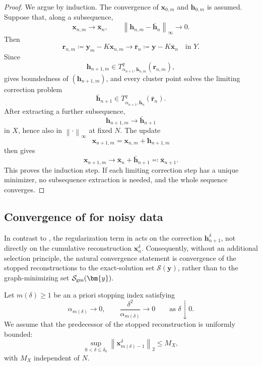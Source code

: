 \documentclass{article}
\theoremstyle{remark}
\newcommand{\norm}[1]{\left\lVert #1 \right\rVert}
\newcommand{\Ssol}{\mathcal{S}}
\newcommand{\bx}{{\bm{x}}}
\newcommand{\by}{{\bm{y}}}
\newcommand{\bh}{{\bm{h}}}
\newcommand{\br}{{\bm{r}}}
\begin{document}
\begin{proof}
We argue by induction. The convergence of \(\bx_{0,m}\) and \(\bh_{0,m}\) is
assumed. Suppose that, along a subsequence,
\[
\bx_{n,m}\to \bar\bx_n,
\qquad
\norm{\bh_{n,m}-\bar\bh_n}_\infty\to0 .
\]
Then
\[
\br_{n,m}\coloneqq \by_m-K\bx_{n,m}
\to
\bar\br_n\coloneqq \by-K\bar\bx_n
\quad\text{in }Y .
\]
Since
\[
\bh_{n+1,m}\in T_{\alpha_{n+1},\bh_{n,m}}^q(\br_{n,m}),
\]
 gives boundedness of
\((\bh_{n+1,m})\), and every cluster point solves the limiting correction
problem
\[
\bar\bh_{n+1}\in T_{\alpha_{n+1},\bar\bh_n}^q(\bar\br_n).
\]
After extracting a further subsequence,
\[
\bh_{n+1,m}\to \bar\bh_{n+1}
\]
in \(X\), hence also in \(\norm{\cdot}_\infty\) at fixed \(N\). The update
\[
\bx_{n+1,m}=\bx_{n,m}+\bh_{n+1,m}
\]
then gives
\[
\bx_{n+1,m}\to \bar\bx_n+\bar\bh_{n+1}\eqqcolon \bar\bx_{n+1}.
\]
This proves the induction step. If each limiting correction step has a unique
minimizer, no subsequence extraction is needed, and the whole sequence converges.
\end{proof}

\subsection{Convergence of \texorpdfstring{}{the error-equation scheme} for noisy data}
\label{sec:error-noisy}

In contrast to , the regularization term in
 acts on the correction \(\bh_{n+1}^\delta\), not directly
on the cumulative reconstruction \(\bx_n^\delta\). Consequently, without an
additional selection principle, the natural convergence statement is convergence
of the stopped reconstructions to the exact-solution set \(\Ssol(\by)\), rather
than to the graph-minimizing set \(\mathcal S_{\rm gm}(\by)\).

Let \(m(\delta)\ge1\) be an a priori stopping index satisfying
\begin{equation}\label{eq:error-apriori-rule}
\alpha_{m(\delta)}\to0,
\qquad
\frac{\delta^2}{\alpha_{m(\delta)}}\to0
\qquad\text{as }\delta\downarrow0 .
\end{equation}
We assume that the predecessor of the stopped reconstruction is uniformly
bounded:
\begin{equation}\label{eq:error-noisy-bounded-x}
\sup_{0<\delta\le\delta_0}
\norm{\bx_{m(\delta)-1}^\delta}_2
\le M_X,
\end{equation}
with \(M_X\) independent of \(N\). 
\end{document}

